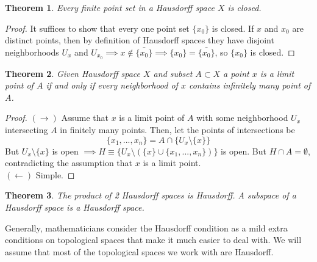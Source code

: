 \documentclass{article}
\newtheorem{theorem}{Theorem}[section]
\theoremstyle{remark}
\theoremstyle{definition}
\begin{document}
\begin{theorem}
Every finite point set in a Hausdorff space $X$ is closed. 
\end{theorem}
\begin{proof}
It suffices to show that every one point set $\{x_0\}$ is closed. If $x$ and $x_0$ are distinct points, then by definition of Hausdorff spaces they have disjoint neighborhoods $U_x$ and $U_{x_0} \implies x \not\in \bar{\{x_0\}} \implies \{x_0\} = \bar{\{x_0\}}$, so $\{x_0\}$ is closed. 
\end{proof}

\begin{theorem}
Given Hausdorff space $X$ and subset $A \subset X$ a point $x$ is a limit point of $A$ if and only if every neighborhood of $x$ contains infinitely many point of $A$. 
\end{theorem}
\begin{proof}
$(\rightarrow)$ Assume that $x$ is a limit point of $A$ with some neighborhood $U_x$ intersecting $A$ in finitely many points. Then, let the points of intersections be 
\[\{x_1, ..., x_n\} = A \cap \{U_x \setminus \{x\} \} \]
But $U_x \setminus \{x\}$ is open $\implies H \equiv \{U_x \setminus ( \{x\} \cup \{x_1, ..., x_n\})\}$ is open. But $H \cap A = \emptyset$, contradicting the assumption that $x$ is a limit point. \\
$(\leftarrow)$ Simple. 
\end{proof}

\begin{theorem}
The product of 2 Hausdorff spaces is Hausdorff. A subspace of a Hausdorff space is a Hausdorff space. 
\end{theorem}

Generally, mathematicians consider the Hausdorff condition as a mild extra conditions on topological spaces that make it much easier to deal with. We will assume that most of the topological spaces we work with are Hausdorff. 
\end{document}
